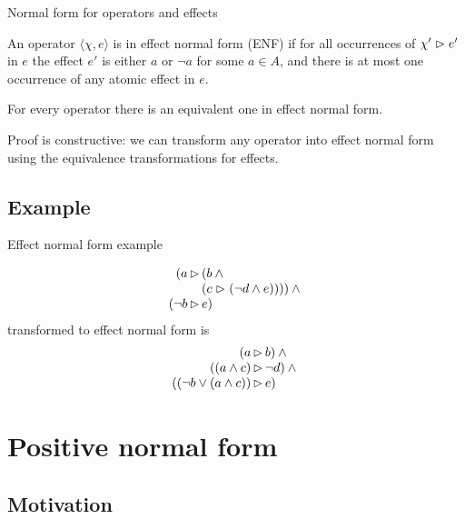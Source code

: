 \documentclass{gkibeamer}
\begin{document}
\begin{frame}{Normal form for operators and effects}
  \begin{definition}
    An operator $\langle \chi,e\rangle$ is in \alert{effect normal form (ENF)}
    if for all occurrences of $\chi'\vartriangleright e'$ in $e$ the effect $e'$ is either $a$
    or $\neg a$ for some $a\in A$, and there is at most one occurrence of any
    atomic effect in $e$.
  \end{definition}

  \begin{theorem}
    For every operator there is an equivalent one in effect normal form.
  \end{theorem}

  Proof is constructive: we can transform any operator into effect
  normal form using the equivalence transformations for effects.
\end{frame}

\subsection{Example}
\begin{frame}{Effect normal form example}
  \begin{example}
    \[
      \begin{array}{r@{\,}c@{\,}l}
        (a & \CEF & (b\land{} \\
        && (c\CEF(\neg d\land e))))\land{} \\
        (\neg b & \CEF & e)
      \end{array}
      \]
    transformed to effect normal form is
    \[
      \begin{array}{r@{\,}c@{\,}l}
        (a & \CEF & b)\land{} \\
        ((a\land c) & \CEF & \neg d)\land{} \\
        ((\neg b\lor(a\land c)) & \CEF & e)
      \end{array}
      \]
  \end{example}
\end{frame}

\section{Positive normal form}
\subsection{Motivation}
\end{document}
